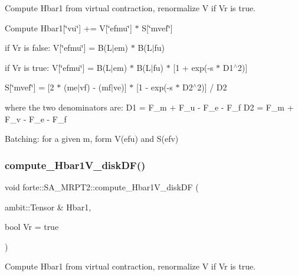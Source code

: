 Compute Hbar1 from virtual contraction, renormalize V if Vr is true. 

Compute Hbar1\mbox{[}\char`\"{}vu\char`\"{}\mbox{]} += V\mbox{[}\char`\"{}efmu\char`\"{}\mbox{]} $\ast$ S\mbox{[}\char`\"{}mvef\char`\"{}\mbox{]}


\begin{DoxyItemize}
\item if Vr is false\+: V\mbox{[}\char`\"{}efmu\char`\"{}\mbox{]} = B(L$\vert$em) $\ast$ B(L$\vert$fu)
\item if Vr is true\+: V\mbox{[}\char`\"{}efmu\char`\"{}\mbox{]} = B(L$\vert$em) $\ast$ B(L$\vert$fu) $\ast$ \mbox{[}1 + exp(-\/s $\ast$ D1$^\wedge$2)\mbox{]}
\item S\mbox{[}\char`\"{}mvef\char`\"{}\mbox{]} = \mbox{[}2 $\ast$ (me$\vert$vf) -\/ (mf$\vert$ve)\mbox{]} $\ast$ \mbox{[}1 -\/ exp(-\/s $\ast$ D2$^\wedge$2)\mbox{]} / D2
\end{DoxyItemize}

where the two denominators are\+: D1 = F\+\_\+m + F\+\_\+u -\/ F\+\_\+e -\/ F\+\_\+f D2 = F\+\_\+m + F\+\_\+v -\/ F\+\_\+e -\/ F\+\_\+f

Batching\+: for a given m, form V(efu) and S(efv)\mbox{\label{classforte_1_1_s_a___m_r_p_t2_ac8391bf7b03228fa77b77ab7a6cfd00e}} 
\subsubsection{\texorpdfstring{compute\+\_\+\+Hbar1\+V\+\_\+disk\+D\+F()}{compute\_Hbar1V\_diskDF()}}
{\footnotesize\ttfamily void forte\+::\+S\+A\+\_\+\+M\+R\+P\+T2\+::compute\+\_\+\+Hbar1\+V\+\_\+disk\+DF (\begin{DoxyParamCaption}\item[{ambit\+::\+Tensor \&}]{Hbar1,  }\item[{bool}]{Vr = {\ttfamily true} }\end{DoxyParamCaption})\hspace{0.3cm}{\ttfamily [protected]}}



Compute Hbar1 from virtual contraction, renormalize V if Vr is true. 

